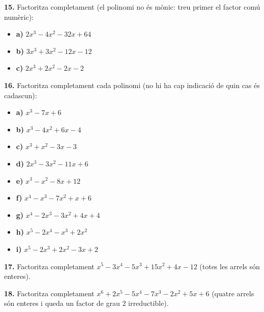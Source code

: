 \documentclass[13pt,a4paper]{extarticle}
\begin{document}
\par\noindent\begin{minipage}{\linewidth}
\textbf{15.} Factoritza completament (el polinomi no és mònic: treu primer el factor comú numèric):\par

\begin{itemize}[leftmargin=0pt,itemsep=3pt,topsep=3pt,parsep=0pt,label={}]
\item \textbf{a)} $2x^3-4x^2-32x+64$
\item \textbf{b)} $3x^3+3x^2-12x-12$
\item \textbf{c)} $2x^3+2x^2-2x-2$
\end{itemize}
\end{minipage}\par\vspace{1.6mm}
\par\noindent\begin{minipage}{\linewidth}
\textbf{16.} Factoritza completament cada polinomi (no hi ha cap indicació de quin cas és cadascun):\par

\begin{itemize}[leftmargin=0pt,itemsep=3pt,topsep=3pt,parsep=0pt,label={}]
\item \textbf{a)} $x^3-7x+6$
\item \textbf{b)} $x^3-4x^2+6x-4$
\item \textbf{c)} $x^3+x^2-3x-3$
\item \textbf{d)} $2x^3-3x^2-11x+6$
\item \textbf{e)} $x^3-x^2-8x+12$
\item \textbf{f)} $x^4-x^3-7x^2+x+6$
\item \textbf{g)} $x^4-2x^3-3x^2+4x+4$
\item \textbf{h)} $x^5-2x^4-x^3+2x^2$
\item \textbf{i)} $x^5-2x^3+2x^2-3x+2$
\end{itemize}
\end{minipage}\par\vspace{1.6mm}
\par\noindent\begin{minipage}{\linewidth}
\textbf{17.} Factoritza completament $x^5-3x^4-5x^3+15x^2+4x-12$ (totes les arrels són enteres).\par
\end{minipage}\par\vspace{1.6mm}
\par\noindent\begin{minipage}{\linewidth}
\textbf{18.} Factoritza completament $x^6+2x^5-5x^4-7x^3-2x^2+5x+6$ (quatre arrels són enteres i queda un factor de grau $2$ irreductible).\par
\end{minipage}\par\vspace{1.6mm}
\end{document}
